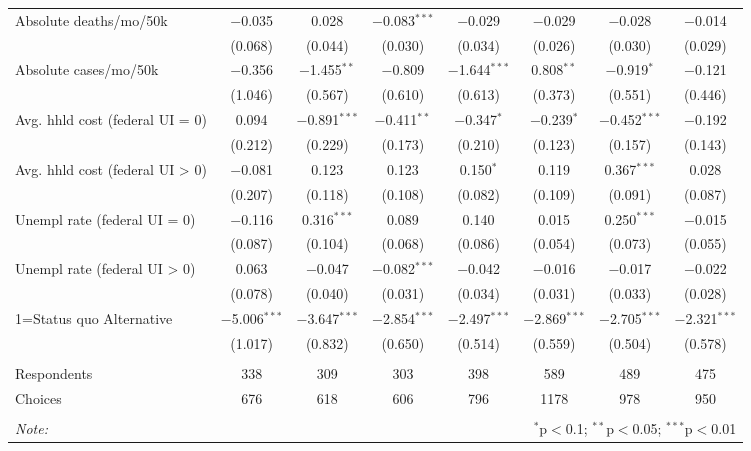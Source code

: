 \begin{table}[!htbp]
\begin{tabular}{@{\extracolsep{5pt}}lccccccc}
 Absolute deaths/mo/50k & $-$0.035 & 0.028 & $-$0.083$^{***}$ & $-$0.029 & $-$0.029 & $-$0.028 & $-$0.014 \\ 
  & (0.068) & (0.044) & (0.030) & (0.034) & (0.026) & (0.030) & (0.029) \\ 
  Absolute cases/mo/50k & $-$0.356 & $-$1.455$^{**}$ & $-$0.809 & $-$1.644$^{***}$ & 0.808$^{**}$ & $-$0.919$^{*}$ & $-$0.121 \\ 
  & (1.046) & (0.567) & (0.610) & (0.613) & (0.373) & (0.551) & (0.446) \\ 
  Avg. hhld cost (federal UI = 0) & 0.094 & $-$0.891$^{***}$ & $-$0.411$^{**}$ & $-$0.347$^{*}$ & $-$0.239$^{*}$ & $-$0.452$^{***}$ & $-$0.192 \\ 
  & (0.212) & (0.229) & (0.173) & (0.210) & (0.123) & (0.157) & (0.143) \\ 
  Avg. hhld cost (federal UI > 0) & $-$0.081 & 0.123 & 0.123 & 0.150$^{*}$ & 0.119 & 0.367$^{***}$ & 0.028 \\ 
  & (0.207) & (0.118) & (0.108) & (0.082) & (0.109) & (0.091) & (0.087) \\ 
  Unempl rate (federal UI = 0) & $-$0.116 & 0.316$^{***}$ & 0.089 & 0.140 & 0.015 & 0.250$^{***}$ & $-$0.015 \\ 
  & (0.087) & (0.104) & (0.068) & (0.086) & (0.054) & (0.073) & (0.055) \\ 
  Unempl rate (federal UI > 0) & 0.063 & $-$0.047 & $-$0.082$^{***}$ & $-$0.042 & $-$0.016 & $-$0.017 & $-$0.022 \\ 
  & (0.078) & (0.040) & (0.031) & (0.034) & (0.031) & (0.033) & (0.028) \\ 
  1=Status quo Alternative & $-$5.006$^{***}$ & $-$3.647$^{***}$ & $-$2.854$^{***}$ & $-$2.497$^{***}$ & $-$2.869$^{***}$ & $-$2.705$^{***}$ & $-$2.321$^{***}$ \\ 
  & (1.017) & (0.832) & (0.650) & (0.514) & (0.559) & (0.504) & (0.578) \\ 
 \hline \\[-1.8ex] 
Respondents & 338 & 309 & 303 & 398 & 589 & 489 & 475\\ 
 Choices & 676 & 618 & 606 & 796 & 1178 & 978 & 950\\ 
\hline 
\hline \\[-1.8ex] 
\textit{Note:}  & \multicolumn{7}{r}{$^{*}$p$<$0.1; $^{**}$p$<$0.05; $^{***}$p$<$0.01} \\ 
\end{tabular} 
\end{table} 
